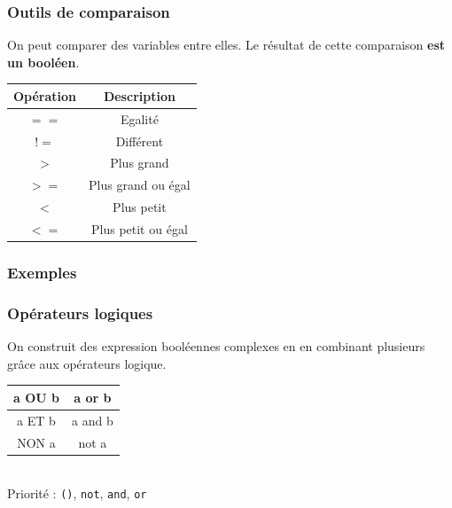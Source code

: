 \documentclass[handout]{beamer}
\begin{document}
\begin{frame}
\frametitle{Outils de comparaison}
On peut comparer des variables entre elles. Le résultat de cette comparaison \textbf{est un booléen}.
\begin{table}[!h]
    \centering
    \begin{tabular}{|c|c|}
        \hline
         Opération & Description\\
        \hline
        $==$ & Egalité \\
        \hline
        $!=$ & Différent \\
        \hline
        $>$ & Plus grand \\
        \hline
        $>=$ & Plus grand ou égal \\
        \hline
        $<$ & Plus petit  \\
        \hline
        $<=$  & Plus petit ou égal \\
        \hline
    \end{tabular}
    \label{operStr}
\end{table}
\end{frame}




\begin{frame}
\frametitle{Exemples}
\compexemples
\end{frame}

\begin{frame}
\frametitle{Opérateurs logiques}
On construit des expression booléennes complexes en en combinant plusieurs grâce aux opérateurs logique.
\begin{table}[!h]
    \centering
    \begin{tabular}{|c|c|}
        \hline
        a OU b & a or b\\
        \hline
        a ET b & a and b \\
        \hline
        NON a & not a \\
        \hline
    \end{tabular}\\
    Priorité : \texttt{()}, \texttt{not}, \texttt{and}, \texttt{or}
\end{table}
\end{frame}

\end{document}

